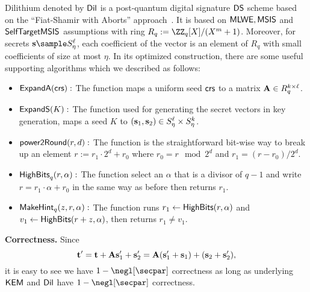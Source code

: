 \begin{definition}
Dilithium denoted by $\mathsf{Dil}$ is a post-quantum digital signature $\mathsf{DS}$ scheme based on the ``Fiat-Shamir with Aborts'' approach~\cite{AC:Lyubashevsky09,EC:Lyubashevsky12}. It is based on $\mathsf{MLWE},\mathsf{MSIS}$ and $\mathsf{SelfTargetMSIS}$ assumptions with ring $R_q:=\ZZ_q[X]/(X^m+1)$. Moreover, for secrets $\sn\sample S^\ell_\eta$, each coefficient of the vector is an element of $R_q$ with small coefficients of size at most $\eta$. In its optimized construction, there are some useful supporting algorithms which we described as follows:
\begin{itemize}[leftmargin=*]
    \item $\mathsf{ExpandA}(\mathsf{crs}):$ The  function  maps a uniform seed $\mathsf{crs}$ to a matrix $\mathbf{A}\in R^{k\times\ell}_q$.
    \item $\mathsf{ExpandS}(K):$ The  function  used for generating the secret
    vectors in key generation, maps a seed $K$ to $(\mathbf{s}_1,\mathbf{s}_2)\in S^\ell_\eta\times S^k_\eta$.
    \item $\mathsf{power2Round}(r, d):$ The function  is the straightforward
    bit-wise way to break up an element $r := r_1\cdot2^d+r_0$ where $r_0 = r\mod 2^d$ and $r_1 = (r-r_0)/2^d$.
    \item $\mathsf{HighBits}_q(r,\alpha):$ The function  select an $\alpha$ that is a divisor of $q-1$ and write $r = r_1\cdot \alpha + r_0$ in the same way as before then returns $r_1$.
    \item $\mathsf{MakeHint}_q(z,r,\alpha):$ The function  runs $r_1\gets\mathsf{HighBits}(r,\alpha)$ and $v_1\gets\mathsf{HighBits}(r+z,\alpha)$, then returns $r_1\ne v_1$.
\end{itemize}
\end{definition}




\smallskip\noindent\textbf{Correctness.}
Since
$$\mathbf{t}'=\mathbf{t}+\mathbf{A}\mathbf{s}'_1+\mathbf{s}'_2=\mathbf{A}(\mathbf{s}'_1+\mathbf{s}_1)+ (\mathbf{s}_2+\mathbf{s}'_2),
$$
it is easy to see we have $1-
\negl[\secpar]$ correctness as long as underlying $\mathsf{KEM}$ and $\mathsf{Dil}$ have $1-
\negl[\secpar]$ correctness.

